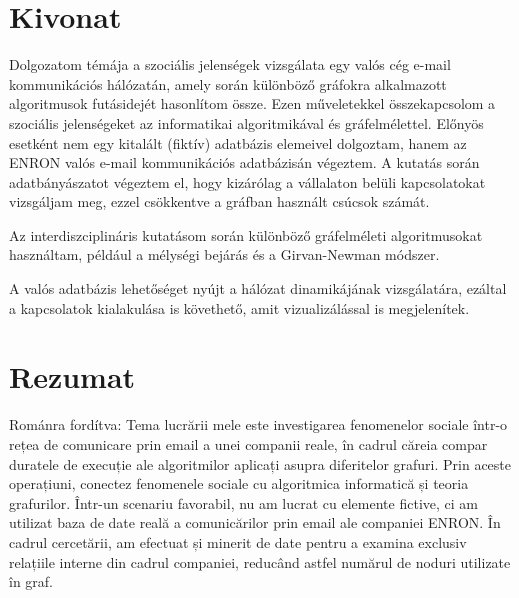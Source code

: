 
\hungarianParagraph


\chapter*{Kivonat}
Dolgozatom témája a szociális jelenségek vizsgálata egy valós cég e-mail kommunikációs hálózatán, amely során különböző gráfokra alkalmazott algoritmusok futásidejét hasonlítom össze. Ezen műveletekkel összekapcsolom a szociális jelenségeket az informatikai algoritmikával és gráfelmélettel. Előnyös esetként nem egy kitalált (fiktív) adatbázis elemeivel dolgoztam, hanem az ENRON valós e-mail kommunikációs adatbázisán végeztem. A kutatás során adatbányászatot végeztem el, hogy kizárólag a vállalaton belüli kapcsolatokat vizsgáljam meg, ezzel csökkentve a gráfban használt csúcsok számát.

Az interdiszciplináris kutatásom során különböző gráfelméleti algoritmusokat használtam, például a mélységi bejárás és a Girvan-Newman módszer.

A valós adatbázis lehetőséget nyújt a hálózat dinamikájának vizsgálatára, ezáltal a kapcsolatok kialakulása is követhető, amit vizualizálással is megjelenítek.


\vfill
{}

\chapter*{Rezumat}

Románra fordítva: Tema lucrării mele este investigarea fenomenelor sociale într-o rețea de comunicare prin email a unei companii reale, în cadrul căreia compar duratele de execuție ale algoritmilor aplicați asupra diferitelor grafuri. Prin aceste operațiuni, conectez fenomenele sociale cu algoritmica informatică și teoria grafurilor. Într-un scenariu favorabil, nu am lucrat cu elemente fictive, ci am utilizat baza de date reală a comunicărilor prin email ale companiei ENRON. În cadrul cercetării, am efectuat și minerit de date pentru a examina exclusiv relațiile interne din cadrul companiei, reducând astfel numărul de noduri utilizate în graf.

